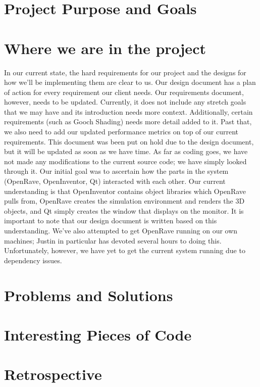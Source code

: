 \documentclass[10pt,journal,compsoc,draftclsnofoot]{IEEEtran}
\begin{document}
\begin{flushleft}

\section{Project Purpose and Goals}


\section{Where we are in the project}
In our current state, the hard requirements for our project and the designs for how we'll be implementing them are clear to us.
Our design document has a plan of action for every requirement our client needs.
Our requirements document, however, needs to be updated.
Currently, it does not include any stretch goals that we may have and its introduction needs more context.
Additionally, certain requirements (such as Gooch Shading) needs more detail added to it.
Past that, we also need to add our updated performance metrics on top of our current requirements.
This document was been put on hold due to the design document, but it will be updated as soon as we have time.
As far as coding goes, we have not made any modifications to the current source code; we have simply looked through it.
Our initial goal was to ascertain how the parts in the system (OpenRave, OpenInventor, Qt) interacted with each other.
Our current understanding is that OpenInventor contains object libraries which OpenRave pulls from, OpenRave creates the simulation environment and renders the 3D objects, and Qt simply creates the window that displays on the monitor.
It is important to note that our design document is written based on this understanding.
We've also attempted to get OpenRave running on our own machines; Justin in particular has devoted several hours to doing this.
Unfortunately, however, we have yet to get the current system running due to dependency issues.

\section{Problems and Solutions}


\section{Interesting Pieces of Code}


\newpage

\section{Retrospective}


\end{flushleft}
\end{document}
